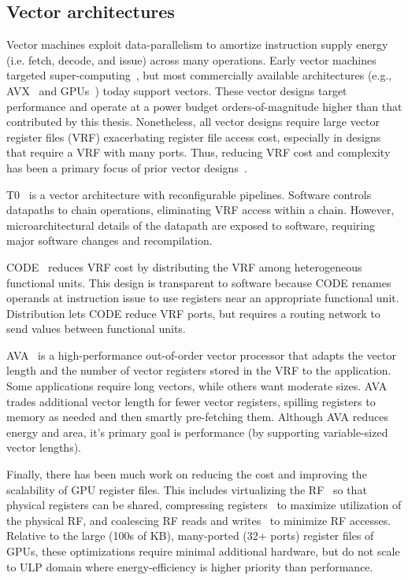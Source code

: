 \subsection{Vector architectures}
\label{chapter:background:program:vector}
Vector machines exploit data-parallelism to amortize instruction supply energy (i.e. fetch, decode, and issue) across many operations.
% 
Early vector machines targeted super-computing~\cite{cray_patent}, but most commercially available architectures (e.g., AVX~\cite{avx} and GPUs~\cite{fermi}) today support vectors.
% 
These vector designs target performance and operate at a power budget
orders-of-magnitude higher than that contributed by this thesis.
% 
Nonetheless, all vector designs require large vector register files (VRF)
exacerbating register file access cost, especially in designs that require a
VRF with many ports. 
% 
Thus, reducing VRF cost and complexity has been a primary focus of prior vector
designs~\cite{asanovic1996t0,kozyrakis2003overcoming}.

T0~\cite{asanovic1996t0,wawrzynek1996spert} is a vector architecture with
reconfigurable pipelines. 
% 
Software controls datapaths to chain operations,
eliminating VRF access within a chain.  
% 
However, microarchitectural details of
the datapath are exposed to software, requiring major software changes and
recompilation.

CODE~\cite{kozyrakis2003overcoming} reduces VRF cost by distributing the VRF
among heterogeneous functional units.
% 
This design is transparent to software 
because CODE renames operands at instruction issue
to use registers near an appropriate functional unit.
% 
Distribution lets CODE reduce VRF ports, but requires a routing network
to send values between functional units.

AVA~\cite{lazo2021adaptable} is a high-performance out-of-order vector processor that adapts the vector length and the number of vector registers stored in the VRF to the application.
% 
Some applications require long vectors, while others want moderate sizes.
% 
AVA trades additional vector length for fewer vector registers, spilling registers to memory as needed and then smartly pre-fetching them.
% 
Although AVA reduces energy and area, it's primary goal is performance (by supporting variable-sized vector lengths).

Finally, there has been much work on reducing the cost and improving the scalability of GPU register files.
% 
This includes virtualizing the RF~\cite{jeon2015gpu,vijaykumar2016zorua} so that physical registers can be shared, compressing registers~\cite{lee2015warped} to maximize utilization of the physical RF, and coalescing RF reads and writes~\cite{asghari2019corf} to minimize RF accesses. 
% 
Relative to the large (100s of KB), many-ported (32+ ports) register files of GPUs, these optimizations require minimal additional hardware, but do not scale to ULP domain where energy-efficiency is higher priority than performance.

